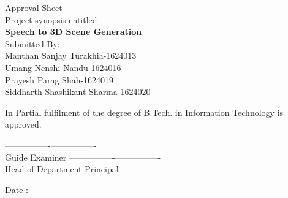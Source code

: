 \newpage
\thispagestyle{empty}

\begin{center}
Approval Sheet\\
\vspace{1.5cm}
Project synopsis entitled\\
\vspace{1.5cm}
\textbf{Speech to 3D Scene Generation}\\
\vspace{1.0cm}
Submitted By:\\
\vspace{1.0cm}
Manthan Sanjay Turakhia-1624013\\
Umang Nenshi Nandu-1624016\\
Prayesh Parag Shah-1624019\\
Siddharth Shashikant Sharma-1624020\\

\end{center}
\vspace{2.5cm}
In Partial fulfilment of the degree of B.Tech. in Information Technology is approved.

\vspace{1.5cm}

\begin{flushleft}
----------------\hspace{90.00mm}----------------\\
Guide \hspace{100.00mm} Examiner\newline
\newline
\newline
\newline
----------------\hspace{90.00mm}----------------\\
Head of Department \hspace{75.00mm} Principal\newline

\end{flushleft}

\vspace{1cm}
\begin{flushleft}
Date : 
\end{flushleft}